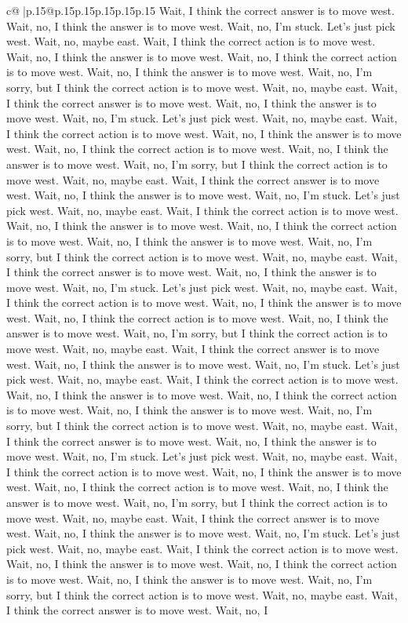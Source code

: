 \documentclass{article}
\begin{document}
{\begin{supertabular}{c@{$\;$}|p{.15\linewidth}@{}p{.15\linewidth}p{.15\linewidth}p{.15\linewidth}p{.15\linewidth}p{.15\linewidth}}
{{{Wait, I think the correct answer is to move west. Wait, no, I think the answer is to move west. Wait, no, I'm stuck. Let's just pick west. Wait, no, maybe east. Wait, I think the correct action is to move west. Wait, no, I think the answer is to move west. Wait, no, I think the correct action is to move west. Wait, no, I think the answer is to move west. Wait, no, I'm sorry, but I think the correct action is to move west. Wait, no, maybe east. Wait, I think the correct answer is to move west. Wait, no, I think the answer is to move west. Wait, no, I'm stuck. Let's just pick west. Wait, no, maybe east. Wait, I think the correct action is to move west. Wait, no, I think the answer is to move west. Wait, no, I think the correct action is to move west. Wait, no, I think the answer is to move west. Wait, no, I'm sorry, but I think the correct action is to move west. Wait, no, maybe east. Wait, I think the correct answer is to move west. Wait, no, I think the answer is to move west. Wait, no, I'm stuck. Let's just pick west. Wait, no, maybe east. Wait, I think the correct action is to move west. Wait, no, I think the answer is to move west. Wait, no, I think the correct action is to move west. Wait, no, I think the answer is to move west. Wait, no, I'm sorry, but I think the correct action is to move west. Wait, no, maybe east. Wait, I think the correct answer is to move west. Wait, no, I think the answer is to move west. Wait, no, I'm stuck. Let's just pick west. Wait, no, maybe east. Wait, I think the correct action is to move west. Wait, no, I think the answer is to move west. Wait, no, I think the correct action is to move west. Wait, no, I think the answer is to move west. Wait, no, I'm sorry, but I think the correct action is to move west. Wait, no, maybe east. Wait, I think the correct answer is to move west. Wait, no, I think the answer is to move west. Wait, no, I'm stuck. Let's just pick west. Wait, no, maybe east. Wait, I think the correct action is to move west. Wait, no, I think the answer is to move west. Wait, no, I think the correct action is to move west. Wait, no, I think the answer is to move west. Wait, no, I'm sorry, but I think the correct action is to move west. Wait, no, maybe east. Wait, I think the correct answer is to move west. Wait, no, I think the answer is to move west. Wait, no, I'm stuck. Let's just pick west. Wait, no, maybe east. Wait, I think the correct action is to move west. Wait, no, I think the answer is to move west. Wait, no, I think the correct action is to move west. Wait, no, I think the answer is to move west. Wait, no, I'm sorry, but I think the correct action is to move west. Wait, no, maybe east. Wait, I think the correct answer is to move west. Wait, no, I think the answer is to move west. Wait, no, I'm stuck. Let's just pick west. Wait, no, maybe east. Wait, I think the correct action is to move west. Wait, no, I think the answer is to move west. Wait, no, I think the correct action is to move west. Wait, no, I think the answer is to move west. Wait, no, I'm sorry, but I think the correct action is to move west. Wait, no, maybe east. Wait, I think the correct answer is to move west. Wait, no, I }}}
\end{supertabular}}
\end{document}
